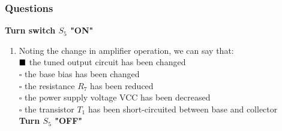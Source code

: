 \documentclass[12pt,a4paper]{article}
\begin{document}
    \subsubsection{Questions}
    \textbf{Turn switch $S_5$ "ON"}
    \begin{enumerate}
        \item Noting the change in amplifier operation, we can say that:\\
            \(\textcolor{black}{\blacksquare}\) the tuned output circuit has been changed\\
            \(\square\) the base bias has been changed\\
            \(\square\) the resistance $R_7$ has been reduced\\
            \(\square\) the power supply voltage VCC has been decreased\\
            \(\square\) the transistor $T_1$ has been short-circuited between base and collector\\
            
    \textbf{Turn $S_5$ "OFF"}
    \end{enumerate}
\end{document}
